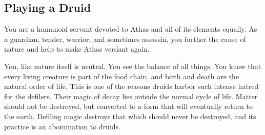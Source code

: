 
\subsection{Playing a Druid}
You are a humanoid servant devoted to Athas and all of its elements equally. As a guardian, tender, warrior, and sometimes assassin, you further the cause of nature and help to make Athas verdant again.

You, like nature itself is neutral. You see the balance of all things. You know that every living creature is part of the food chain, and birth and death are the natural order of life. This is one of the reasons druids harbor such intense hatred for the defilers. Their magic of decay lies outside the normal cycle of life. Matter should not be destroyed, but converted to a form that will eventually return to the earth. Defiling magic destroys that which should never be destroyed, and its practice is an abomination to druids.


